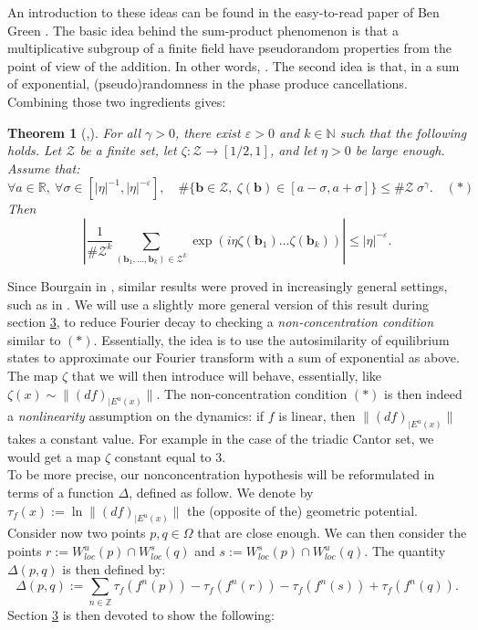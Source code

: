 \documentclass[a4paper]{article}
\newtheorem{theorem}{Theorem}[section]
\theoremstyle{definition}
\begin{document}
An introduction to these ideas can be found in the easy-to-read paper of Ben Green \cite{Gr09}. The basic idea behind the sum-product phenomenon is that a multiplicative subgroup of a finite field have pseudorandom properties from the point of view of the addition. In other words, . The second idea is that, in a sum of exponential, (pseudo)randomness in the phase produce cancellations. Combining those two ingredients gives:

\begin{theorem}[\cite{BD17},\cite{Bo10}]
For all $\gamma > 0$, there exist $\varepsilon > 0$ and $k \in \mathbb{N}$ such that the
following holds. Let $\mathcal{Z}$ be a finite set, let $\zeta:\mathcal{Z}\rightarrow [1/2,1]$, and let $\eta>0$ be large enough. Assume that:
$$ \forall a \in \mathbb{R}, \ \forall \sigma \in [|\eta|^{-1}, |\eta|^{- \varepsilon}], \quad \# \{\mathbf{b} \in \mathcal{Z} , \ \zeta(\mathbf{b}) \in [a-\sigma,a+\sigma] \} \leq \# \mathcal{Z} \ \sigma^{\gamma}. \quad (*)$$
Then 
$$ \left|\frac{1}{ \#\mathcal{Z}^{k}} \sum_{(\mathbf{b}_1, \dots, \mathbf{b}_k) \in \mathcal{Z}^k} \exp\left( i \eta \zeta(\mathbf{b}_1) \dots \zeta(\mathbf{b}_k) \right) \right| \leq |\eta|^{-{\varepsilon}}.$$
\end{theorem}


Since Bourgain in \cite{Bo10}, similar results were proved in increasingly general settings, such as in \cite{Li18,HdS22,OdSS24}. We will use a slightly more general version of this result during section \hyperref[sec:3]{3}, to reduce Fourier decay to checking a \emph{non-concentration condition} similar to $(*)$. Essentially, the idea is to use the autosimilarity of equilibrium states to approximate our Fourier transform with a sum of exponential as above. \\

The map $\zeta$ that we will then introduce will behave, essentially, like $\zeta(x) \sim \| (df)_{|E^u(x)} \|$. The non-concentration condition $(*)$ is then indeed a \emph{nonlinearity} assumption on the dynamics: if $f$ is linear, then $\| (df)_{|E^u(x)} \|$ takes a constant value. For example in the case of the triadic Cantor set, we would get a map $\zeta$ constant equal to $3$. \\

To be more precise, our nonconcentration hypothesis will be reformulated in terms of a function $\Delta$, defined as follow. We denote by $\tau_f(x) := \ln \| (df)_{|E^u(x)} \|$ the (opposite of the) geometric potential. Consider now two points $p,q \in \Omega$ that are close enough. We can then consider the points $r := W^u_{loc}(p) \cap W^s_{loc}(q)$ and $s := W^s_{loc}(p) \cap W^u_{loc}(q)$. The quantity $\Delta(p,q)$ is then defined by:
$$ \Delta(p,q) := \sum_{n \in \mathbb{Z}} \tau_f(f^n(p)) - \tau_f(f^n(r)) - \tau_f(f^n(s)) + \tau_f(f^n(q)). $$
Section \hyperref[sec:3]{3} is then devoted to show the following:
\end{document}
